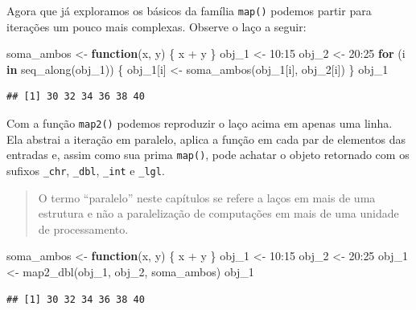 \documentclass[
]{book}
\newenvironment{Shaded}{\begin{snugshade}}{\end{snugshade}}
\newcommand{\ControlFlowTok}[1]{\textcolor[rgb]{0.13,0.29,0.53}{\textbf{#1}}}
\newcommand{\DecValTok}[1]{\textcolor[rgb]{0.00,0.00,0.81}{#1}}
\newcommand{\FunctionTok}[1]{\textcolor[rgb]{0.00,0.00,0.00}{#1}}
\newcommand{\NormalTok}[1]{#1}
\newcommand{\OtherTok}[1]{\textcolor[rgb]{0.56,0.35,0.01}{#1}}
\newcommand{\SpecialCharTok}[1]{\textcolor[rgb]{0.00,0.00,0.00}{#1}}
\begin{document}
Agora que já exploramos os básicos da família \texttt{map()} podemos partir para
iterações um pouco mais complexas. Observe o laço a seguir:

\begin{Shaded}
\begin{Highlighting}[]
\NormalTok{soma\_ambos }\OtherTok{\textless{}{-}} \ControlFlowTok{function}\NormalTok{(x, y) \{ x }\SpecialCharTok{+}\NormalTok{ y \}}
\NormalTok{obj\_1 }\OtherTok{\textless{}{-}} \DecValTok{10}\SpecialCharTok{:}\DecValTok{15}
\NormalTok{obj\_2 }\OtherTok{\textless{}{-}} \DecValTok{20}\SpecialCharTok{:}\DecValTok{25}
\ControlFlowTok{for}\NormalTok{ (i }\ControlFlowTok{in} \FunctionTok{seq\_along}\NormalTok{(obj\_1)) \{}
\NormalTok{  obj\_1[i] }\OtherTok{\textless{}{-}} \FunctionTok{soma\_ambos}\NormalTok{(obj\_1[i], obj\_2[i])}
\NormalTok{\}}
\NormalTok{obj\_1}
\end{Highlighting}
\end{Shaded}

\begin{verbatim}
## [1] 30 32 34 36 38 40
\end{verbatim}

Com a função \texttt{map2()} podemos reproduzir o laço acima em apenas uma linha. Ela
abstrai a iteração em paralelo, aplica a função em cada par de elementos das
entradas e, assim como sua prima \texttt{map()}, pode achatar o objeto retornado com os
sufixos \texttt{\_chr}, \texttt{\_dbl}, \texttt{\_int} e \texttt{\_lgl}.

\begin{quote}
O termo ``paralelo'' neste capítulos se refere a laços em mais de uma estrutura e não a paralelização de computações em mais de uma unidade de processamento.
\end{quote}

\begin{Shaded}
\begin{Highlighting}[]
\NormalTok{soma\_ambos }\OtherTok{\textless{}{-}} \ControlFlowTok{function}\NormalTok{(x, y) \{ x }\SpecialCharTok{+}\NormalTok{ y \}}
\NormalTok{obj\_1 }\OtherTok{\textless{}{-}} \DecValTok{10}\SpecialCharTok{:}\DecValTok{15}
\NormalTok{obj\_2 }\OtherTok{\textless{}{-}} \DecValTok{20}\SpecialCharTok{:}\DecValTok{25}
\NormalTok{obj\_1 }\OtherTok{\textless{}{-}} \FunctionTok{map2\_dbl}\NormalTok{(obj\_1, obj\_2, soma\_ambos)}
\NormalTok{obj\_1}
\end{Highlighting}
\end{Shaded}

\begin{verbatim}
## [1] 30 32 34 36 38 40
\end{verbatim}
\end{document}
